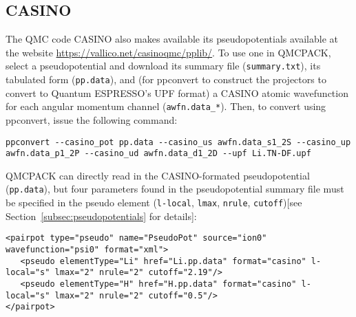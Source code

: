 \subsection{CASINO}
The QMC code CASINO also makes available its pseudopotentials available at the website \url{https://vallico.net/casinoqmc/pplib/}. To use one in QMCPACK, select a pseudopotential and download its summary file (\texttt{summary.txt}), its tabulated form (\texttt{pp.data}), and (for ppconvert to construct the projectors to convert to Quantum ESPRESSO's UPF format) a CASINO atomic wavefunction for each angular momentum channel (\texttt{awfn.data\_*}).  Then, to convert using ppconvert, issue the following command:
\begin{lstlisting}[caption=Convert CASINO-formatted pseudopotential to Quantum ESPRESSO UPF format]
ppconvert --casino_pot pp.data --casino_us awfn.data_s1_2S --casino_up awfn.data_p1_2P --casino_ud awfn.data_d1_2D --upf Li.TN-DF.upf
\end{lstlisting}
QMCPACK can directly read in the CASINO-formated pseudopotential (\texttt{pp.data}), but four parameters found in the pseudopotential summary file must be specified in the pseudo element (\texttt{l-local}, \texttt{lmax}, \texttt{nrule}, \texttt{cutoff})[see Section~\ref{subsec:pseudopotentials} for details]:
\begin{lstlisting}[caption=XML syntax to use CASINO-formatted pseudopotentials in QMCPACK]
<pairpot type="pseudo" name="PseudoPot" source="ion0" wavefunction="psi0" format="xml">
   <pseudo elementType="Li" href="Li.pp.data" format="casino" l-local="s" lmax="2" nrule="2" cutoff="2.19"/>
   <pseudo elementType="H" href="H.pp.data" format="casino" l-local="s" lmax="2" nrule="2" cutoff="0.5"/>
</pairpot>
\end{lstlisting}

